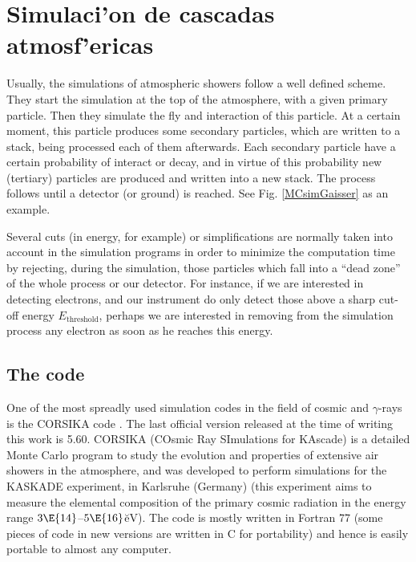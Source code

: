 
\chapter{Simulaci'on de cascadas atmosf'ericas}
\label{chapter:simshowers}\label{ch-simshowers}

Usually, the \MC simulations of atmospheric showers follow a well
defined scheme. They start the simulation at the top of the
atmosphere, with a given primary particle. Then they simulate the fly
and interaction of this particle. At a certain moment, this particle
produces some secondary particles, which are written to a stack, being
processed each of them afterwards. Each secondary particle have a
certain probability of interact or decay, and in virtue of this
probability new (tertiary) particles are produced and written into a
new stack. The process follows until a detector (or ground) is
reached. See Fig. \ref{MCsimGaisser} as an example.

\mcsimschemefig

Several cuts (in energy, for example) or simplifications are normally
taken into account in the simulation programs in order to minimize the
computation time by rejecting, during the simulation, those particles
which fall into a ``dead zone'' of the whole process or our detector.
For instance, if we are interested in detecting electrons, and our
instrument do only detect those above a sharp cut-off energy
$E_{\mathrm{threshold}}$, perhaps we are interested in removing from
the simulation process any electron as soon as he reaches this energy.

\section{The \CORSIKA code}
%
One of the most spreadly used simulation codes in the field of cosmic
and $\gamma$-rays is the CORSIKA code \cite{CORSIKA:manual}. The last
official version released at the time of writing this work is 5.60.
CORSIKA (COsmic Ray SImulations for KAscade) is a detailed Monte Carlo
program to study the evolution and properties of extensive air showers
in the atmosphere, and was developed to perform simulations for the
KASKADE experiment, in Karlsruhe (Germany) \cite{KASKADE} (this
experiment aims to measure the elemental composition of the primary
cosmic radiation in the energy range $3\E{14}$--$5\E{16}$\u{eV}). The
code is mostly written in Fortran 77 (some pieces of code in new
versions are written in C for portability) and hence is easily portable
to almost any computer.

